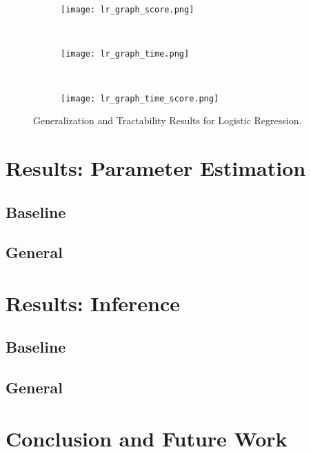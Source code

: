 \documentclass{article}
\begin{document}
\begin{figure}
  \centering
  \begin{subfigure}[b]{0.3\textwidth}
    \centering
    \texttt{[image: lr\_graph\_score.png]}
    \caption*{}
    \label{fig:lr_graph_score}
  \end{subfigure}
  ~
  \begin{subfigure}[b]{0.3\textwidth}
    \centering
    \texttt{[image: lr\_graph\_time.png]}
    \caption*{}
    \label{fig:lr_graph_time}
  \end{subfigure}
  ~
  \begin{subfigure}[b]{0.3\textwidth}
    \centering
    \texttt{[image: lr\_graph\_time\_score.png]}
    \caption*{}
    \label{fig:lr_graph_time_score}
  \end{subfigure}
  \vspace{-10pt}
  \caption{Generalization and Tractability Results for Logistic Regression.}
\end{figure}


\section{Results: Parameter Estimation}
\label{sec:results-param}
\subsection{Baseline}
\subsection{General}


\section{Results: Inference}
\label{sec:results-inference}
\subsection{Baseline}
\subsection{General}


\section{Conclusion and Future Work}
\label{sec:conclusion}








\end{document}
